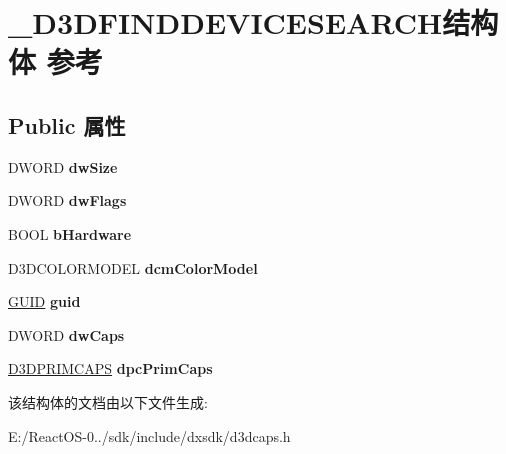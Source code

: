 \hypertarget{struct___d3_d_f_i_n_d_d_e_v_i_c_e_s_e_a_r_c_h}{}\section{\+\_\+\+D3\+D\+F\+I\+N\+D\+D\+E\+V\+I\+C\+E\+S\+E\+A\+R\+C\+H结构体 参考}
\label{struct___d3_d_f_i_n_d_d_e_v_i_c_e_s_e_a_r_c_h}
\subsection*{Public 属性}
\begin{DoxyCompactItemize}
\item 
\mbox{\label{struct___d3_d_f_i_n_d_d_e_v_i_c_e_s_e_a_r_c_h_adc4c0f805b8fa171444e00914243d270}} 
D\+W\+O\+RD {\bfseries dw\+Size}
\item 
\mbox{\label{struct___d3_d_f_i_n_d_d_e_v_i_c_e_s_e_a_r_c_h_a19585943744f84bf638b393cbc2d2bfa}} 
D\+W\+O\+RD {\bfseries dw\+Flags}
\item 
\mbox{\label{struct___d3_d_f_i_n_d_d_e_v_i_c_e_s_e_a_r_c_h_ad305bd45e3faab0f51b83e0da2199c18}} 
B\+O\+OL {\bfseries b\+Hardware}
\item 
\mbox{\label{struct___d3_d_f_i_n_d_d_e_v_i_c_e_s_e_a_r_c_h_a42744fd78da2726610f2412a9e025203}} 
D3\+D\+C\+O\+L\+O\+R\+M\+O\+D\+EL {\bfseries dcm\+Color\+Model}
\item 
\mbox{\label{struct___d3_d_f_i_n_d_d_e_v_i_c_e_s_e_a_r_c_h_a815c924eb8f0d22ab1ada0578624755f}} 
\hyperlink{interface_g_u_i_d}{G\+U\+ID} {\bfseries guid}
\item 
\mbox{\label{struct___d3_d_f_i_n_d_d_e_v_i_c_e_s_e_a_r_c_h_a98d8e9c60e6cda75ce0e5831e7ac68e0}} 
D\+W\+O\+RD {\bfseries dw\+Caps}
\item 
\mbox{\label{struct___d3_d_f_i_n_d_d_e_v_i_c_e_s_e_a_r_c_h_a6440fdbe69489adcd2ea60bd12da18ea}} 
\hyperlink{struct___d3_d_prim_caps}{D3\+D\+P\+R\+I\+M\+C\+A\+PS} {\bfseries dpc\+Prim\+Caps}
\end{DoxyCompactItemize}


该结构体的文档由以下文件生成\+:\begin{DoxyCompactItemize}
\item 
E\+:/\+React\+O\+S-\/0../sdk/include/dxsdk/d3dcaps.\+h\end{DoxyCompactItemize}
